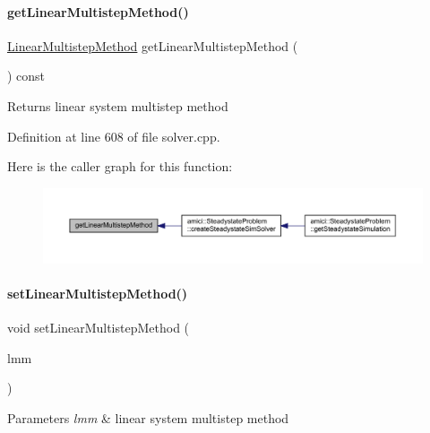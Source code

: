 \paragraph{\texorpdfstring{get\+Linear\+Multistep\+Method()}{getLinearMultistepMethod()}}
{\footnotesize\ttfamily \mbox{\hyperlink{namespaceamici_a9ebe272482a8e073efe7078b7e96e8bc}{Linear\+Multistep\+Method}} get\+Linear\+Multistep\+Method (\begin{DoxyParamCaption}{ }\end{DoxyParamCaption}) const}

\begin{DoxyReturn}{Returns}
linear system multistep method 
\end{DoxyReturn}


Definition at line 608 of file solver.\+cpp.

Here is the caller graph for this function\+:
\nopagebreak
\begin{figure}[H]
\begin{center}
\leavevmode
\includegraphics[width=350pt]{classamici_1_1_solver_a60631d9a18e29c1102cae7cb77b9918c_icgraph}
\end{center}
\end{figure}
\mbox{\label{classamici_1_1_solver_a2143a6f85b81c24611aad5689865953c}} 
\paragraph{\texorpdfstring{set\+Linear\+Multistep\+Method()}{setLinearMultistepMethod()}}
{\footnotesize\ttfamily void set\+Linear\+Multistep\+Method (\begin{DoxyParamCaption}\item[{\mbox{\hyperlink{namespaceamici_a9ebe272482a8e073efe7078b7e96e8bc}{Linear\+Multistep\+Method}}}]{lmm }\end{DoxyParamCaption})}


\begin{DoxyParams}{Parameters}
{\em lmm} & linear system multistep method \\
\hline
\end{DoxyParams}


